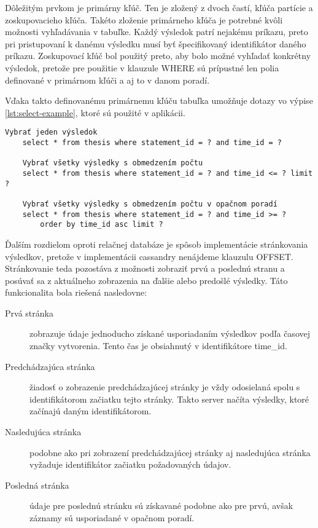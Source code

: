 		Dôležitým prvkom je primárny kľúč. Ten je zložený z dvoch častí, kľúča partície a zoskupovacieho kľúča. Takéto zloženie primárneho kľúča je potrebné kvôli možnosti vyhľadávania v tabuľke. Každý výsledok patrí nejakému príkazu, preto pri pristupovaní k danému výsledku musí byť špecifikovaný identifikátor daného príkazu. Zoskupovací kľúč bol použitý preto, aby bolo možné vyhľadať konkrétny výsledok, pretože pre použitie v klauzule WHERE sú prípustné len polia definované v primárnom kľúči a aj to v danom poradí.
		
		Vďaka takto definovanému primárnemu kľúču tabuľka umožňuje dotazy vo výpise \ref{lst:select-example}, ktoré sú použité v aplikácii.
		\begin{lstlisting}[label=lst:select-example,caption=Príklad príkazov vyhovujúcich definovanému primárnemu kľúču]
	Vybrať jeden výsledok
	select * from thesis where statement_id = ? and time_id = ?
			
	Vybrať všetky výsledky s obmedzením počtu
	select * from thesis where statement_id = ? and time_id <= ? limit ?
			
	Vybrať všetky výsledky s obmedzením počtu v opačnom poradí
	select * from thesis where statement_id = ? and time_id >= ?
		order by time_id asc limit ?
		\end{lstlisting}
		
		Ďalším rozdielom oproti relačnej databáze je spôsob implementácie stránkovania výsledkov, pretože v implementácii cassandry nenájdeme klauzulu OFFSET. Stránkovanie teda pozostáva z možnosti zobraziť prvú a poslednú stranu a posúvať sa z aktuálneho zobrazenia na ďalšie alebo predošlé výsledky. Táto funkcionalita bola riešená nasledovne: \cite{pagination}
		\begin{description}
			\item[Prvá stránka] zobrazuje údaje jednoducho získané usporiadaním výsledkov podľa časovej značky vytvorenia. Tento čas je obsiahnutý v identifikátore time\_id.
			\item[Predchádzajúca stránka] žiadosť o zobrazenie predchádzajúcej stránky je vždy odosielaná spolu s identifikátorom začiatku tejto stránky. Takto server načíta výsledky, ktoré začínajú daným identifikátorom.
			\item[Nasledujúca stránka] podobne ako pri zobrazení predchádzajúcej stránky aj nasledujúca stránka vyžaduje identifikátor začiatku požadovaných údajov.
			\item[Posledná stránka] údaje pre poslednú stránku sú získavané podobne ako pre prvú, avšak záznamy sú usporiadané v opačnom poradí.
		\end{description}
		
